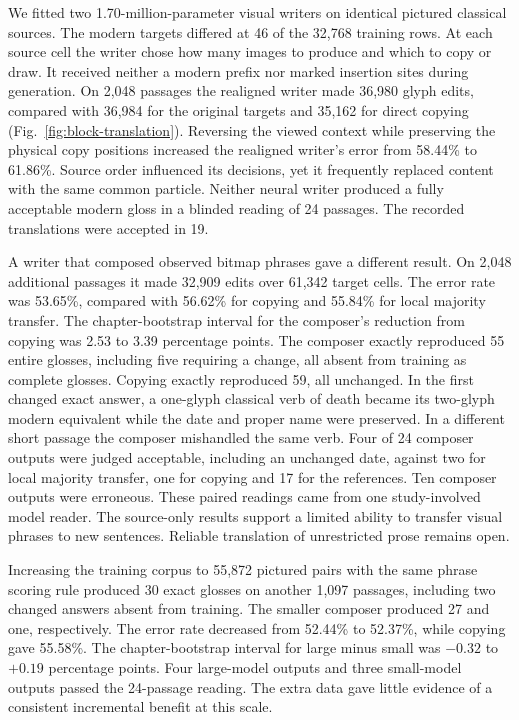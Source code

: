 \documentclass[12pt,a4paper]{article}
\providecommand{\DIFadd}[1]{{\protect\color{blue} \sf #1}} %
\begin{document}
\DIFadd{We fitted two 1.70-million-parameter visual writers on identical pictured classical sources. The modern targets differed at 46 of the 32,768 training rows. At each source cell the writer chose how many images to produce and which to copy or draw. It received neither a modern prefix nor marked insertion sites during generation. On 2,048 passages the realigned writer made 36,980 glyph edits, compared with 36,984 for the original targets and 35,162 for direct copying (Fig.~\ref{fig:block-translation}). Reversing the viewed context while preserving the physical copy positions increased the realigned writer's error from 58.44\% to 61.86\%. Source order influenced its decisions, yet it frequently replaced content with the same common particle. Neither neural writer produced a fully acceptable modern gloss in a blinded reading of 24 passages. The recorded translations were accepted in 19.
}

\DIFadd{A writer that composed observed bitmap phrases gave a different result. On 2,048 additional passages it made 32,909 edits over 61,342 target cells. The error rate was 53.65\%, compared with 56.62\% for copying and 55.84\% for local majority transfer. The chapter-bootstrap interval for the composer's reduction from copying was 2.53 to 3.39 percentage points. The composer exactly reproduced 55 entire glosses, including five requiring a change, all absent from training as complete glosses. Copying exactly reproduced 59, all unchanged. In the first changed exact answer, a one-glyph classical verb of death became its two-glyph modern equivalent while the date and proper name were preserved. In a different short passage the composer mishandled the same verb. Four of 24 composer outputs were judged acceptable, including an unchanged date, against two for local majority transfer, one for copying and 17 for the references. Ten composer outputs were erroneous. These paired readings came from one study-involved model reader. The source-only results support a limited ability to transfer visual phrases to new sentences. Reliable translation of unrestricted prose remains open.
}

\DIFadd{Increasing the training corpus to 55,872 pictured pairs with the same phrase scoring rule produced 30 exact glosses on another 1,097 passages, including two changed answers absent from training. The smaller composer produced 27 and one, respectively. The error rate decreased from 52.44\% to 52.37\%, while copying gave 55.58\%. The chapter-bootstrap interval for large minus small was $-0.32$ to $+0.19$ percentage points. Four large-model outputs and three small-model outputs passed the 24-passage reading. The extra data gave little evidence of a consistent incremental benefit at this scale.
}
\end{document}
